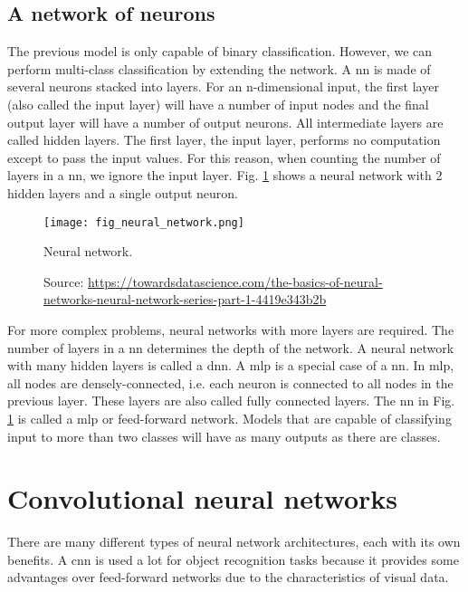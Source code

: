 \subsection{A network of neurons}
The previous model is only capable of binary classification. However, we can perform multi-class classification by extending the network. A \acrfull{nn} is made of several neurons stacked into layers. For an n-dimensional input, the first layer (also called the input layer) will have a number of input nodes and the final output layer will have a number of output neurons. All intermediate layers are called hidden layers. The first layer, the input layer, performs no computation except to pass the input values. For this reason, when counting the number of layers in a \acrshort{nn}, we ignore the input layer. Fig. \ref{fig:neural_network} shows a neural network with 2 hidden layers and a single output neuron. 
\begin{figure}[ht]
    \begin{center}
    \texttt{[image: fig\_neural\_network.png]}
    \caption[Neural network]{Neural network.}
    \caption*{Source: \href{https://towardsdatascience.com/the-basics-of-neural-networks-neural-network-series-part-1-4419e343b2b}{https://towardsdatascience.com/the-basics-of-neural-networks-neural-network-series-part-1-4419e343b2b}}
    \label{fig:neural_network}
    \end{center}
\end{figure}

For more complex problems, neural networks with more layers are required. The number of layers in a \acrshort{nn} determines the depth of the network. A neural network with many hidden layers is called a \acrfull{dnn}. 
A \acrfull{mlp} is a special case of a \acrshort{nn}. In \acrshort{mlp}, all nodes are densely-connected, i.e. each neuron is connected to all nodes in the previous layer. These layers are also called fully connected layers. The \acrshort{nn} in Fig. \ref{fig:neural_network} is called a \acrshort{mlp} or feed-forward network. Models that are capable of classifying input to more than two classes will have as many outputs as there are classes.

\section{Convolutional neural networks}
There are many different types of neural network architectures, each with its own benefits. A \acrfull{cnn} is used a lot for object recognition tasks because it provides some advantages over feed-forward networks due to the characteristics of visual data.

